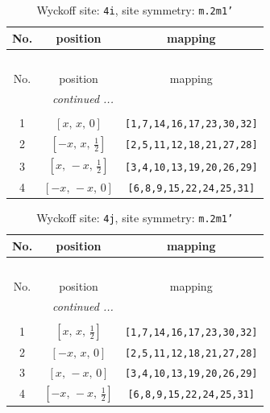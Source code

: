 \documentclass[fleqn,8pt]{jsarticle}
\begin{document}
\renewcommand{\arraystretch}{1.2}
\begin{longtable}{ccc}
\caption{Wyckoff site: {\tt 4i}, site symmetry: {\tt m.2m1'}}
 \\
 \hline \hline
No. & position & mapping \\ \hline \endfirsthead

\multicolumn{2}{l}{\tablename\ \thetable{}} \\
 \hline \hline
No. & position & mapping \\ \hline \endhead

 \hline \hline
\multicolumn{2}{r}{\footnotesize\it continued ...} \\ \endfoot

 \hline \hline
\multicolumn{2}{r}{} \\ \endlastfoot

1 & $\left[ x,\, x,\, 0 \right]$ & {\tt [1,7,14,16,17,23,30,32]} \\ \hline
2 & $\left[ - x,\, x,\, \frac{1}{2} \right]$ & {\tt [2,5,11,12,18,21,27,28]} \\ \hline
3 & $\left[ x,\, - x,\, \frac{1}{2} \right]$ & {\tt [3,4,10,13,19,20,26,29]} \\ \hline
4 & $\left[ - x,\, - x,\, 0 \right]$ & {\tt [6,8,9,15,22,24,25,31]} \\
\end{longtable}
\renewcommand{\arraystretch}{1.2}
\begin{longtable}{ccc}
\caption{Wyckoff site: {\tt 4j}, site symmetry: {\tt m.2m1'}}
 \\
 \hline \hline
No. & position & mapping \\ \hline \endfirsthead

\multicolumn{2}{l}{\tablename\ \thetable{}} \\
 \hline \hline
No. & position & mapping \\ \hline \endhead

 \hline \hline
\multicolumn{2}{r}{\footnotesize\it continued ...} \\ \endfoot

 \hline \hline
\multicolumn{2}{r}{} \\ \endlastfoot

1 & $\left[ x,\, x,\, \frac{1}{2} \right]$ & {\tt [1,7,14,16,17,23,30,32]} \\ \hline
2 & $\left[ - x,\, x,\, 0 \right]$ & {\tt [2,5,11,12,18,21,27,28]} \\ \hline
3 & $\left[ x,\, - x,\, 0 \right]$ & {\tt [3,4,10,13,19,20,26,29]} \\ \hline
4 & $\left[ - x,\, - x,\, \frac{1}{2} \right]$ & {\tt [6,8,9,15,22,24,25,31]} \\
\end{longtable}
\end{document}
